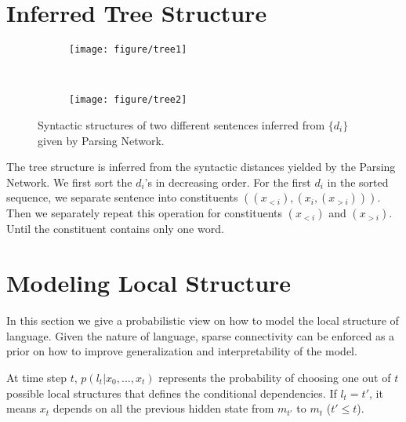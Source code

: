 \documentclass{article} \usepackage{iclr2018_conference,times}
\begin{document}
\section{Inferred Tree Structure}
\label{appendix_tree_fig}
\begin{figure}[h!]
    \centering
    \setlength{\leftskip}{-30pt}
    \begin{subfigure}[b]{0.49\textwidth}
        \texttt{[image: figure/tree1]}
    \end{subfigure}
    ~ 
    \begin{subfigure}[b]{0.49\textwidth}
        \texttt{[image: figure/tree2]}
    \end{subfigure}
    \caption{Syntactic structures of two different sentences inferred from $\{d_i\}$ given by Parsing Network.}
\end{figure}

The tree structure is inferred from the syntactic distances yielded by the Parsing Network. We first sort the $d_i$'s in decreasing order. 
For the first $d_i$ in the sorted sequence, we separate sentence into constituents $((x_{<i}), (x_{i}, (x_{>i})))$. Then we separately repeat this operation for constituents $(x_{<i})$ and $(x_{>i})$. Until the constituent contains only one word.



\section{Modeling Local Structure} \label{appendix_MLS}
In this section we give a probabilistic view on how to model the local structure of language. 
Given the nature of language, sparse connectivity can be enforced as a prior on how to improve generalization and interpretability of the model.







At time step $t$, $p(l_{t}|x_0, ...,x_t)$ represents the probability of choosing one out of $t$ possible local structures that defines the conditional dependencies. 
If $l_{t}=t'$, it means $x_{t}$ depends on all the previous hidden state from $m_{t'}$ to $m_{t}$ ($t'\leq t$). 
\end{document}
